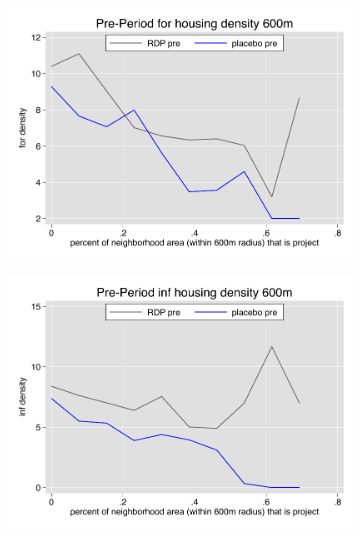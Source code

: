 \documentclass[12pt]{article}
\begin{document}
\pagebreak




\begin{figure}
        \begin{subfigure}[b]{0.495\textwidth}
            \centering
            \includegraphics[width=\textwidth,trim={0.3cm .3cm 0.1cm 0cm}, clip=true]{figures/overlap_for_600_local_pre.pdf}
        \end{subfigure}
        \hfill
        \begin{subfigure}[b]{0.495\textwidth}  
            \centering 
            \includegraphics[width=\textwidth,trim={0.3cm .3cm 0.1cm 0cm}, clip=true]{figures/overlap_inf_600_local_pre.pdf}
        \end{subfigure}

\end{figure}
\end{document}
